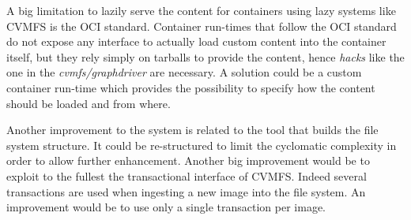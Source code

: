 A big limitation to lazily serve the content for containers using lazy systems
like CVMFS is the OCI standard. Container run-times that follow the OCI
standard do not expose any interface to actually load custom content into the
container itself, but they rely simply on tarballs to provide the content,
hence \textit{hacks} like the one in the \textit{cvmfs/graphdriver} are
necessary. A solution could be a custom container run-time which provides the
possibility to specify how the content should be loaded and from where.

Another improvement to the system is related to the tool that builds the file
system structure. It could be re-structured to limit the cyclomatic complexity
in order to allow further enhancement. Another big improvement would be to
exploit to the fullest the transactional interface of CVMFS. Indeed several
transactions are used when ingesting a new image into the file system. An
improvement would be to use only a single transaction per image.

